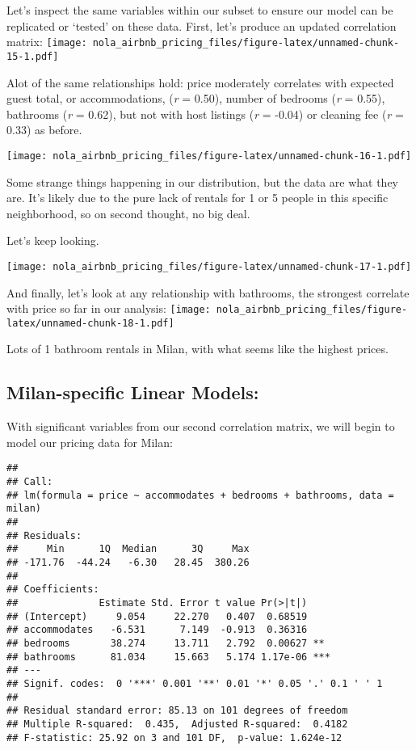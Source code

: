 \documentclass[]{article}
\begin{document}
Let's inspect the same variables within our subset to ensure our model
can be replicated or `tested' on these data. First, let's produce an
updated correlation matrix:
\texttt{[image: nola\_airbnb\_pricing\_files/figure-latex/unnamed-chunk-15-1.pdf]}

Alot of the same relationships hold: price moderately correlates with
expected guest total, or accommodations, (\emph{r} = 0.50), number of
bedrooms (\emph{r} = 0.55), bathrooms (\emph{r} = 0.62), but not with
host listings (\emph{r} = -0.04) or cleaning fee (\emph{r} = 0.33) as
before.

\texttt{[image: nola\_airbnb\_pricing\_files/figure-latex/unnamed-chunk-16-1.pdf]}

Some strange things happening in our distribution, but the data are what
they are. It's likely due to the pure lack of rentals for 1 or 5 people
in this specific neighborhood, so on second thought, no big deal.

Let's keep looking.

\texttt{[image: nola\_airbnb\_pricing\_files/figure-latex/unnamed-chunk-17-1.pdf]}

And finally, let's look at any relationship with bathrooms, the
strongest correlate with price so far in our analysis:
\texttt{[image: nola\_airbnb\_pricing\_files/figure-latex/unnamed-chunk-18-1.pdf]}

Lots of 1 bathroom rentals in Milan, with what seems like the highest
prices.

\hypertarget{milan-specific-linear-models}{%
\subsection{Milan-specific Linear
Models:}\label{milan-specific-linear-models}}

With significant variables from our second correlation matrix, we will
begin to model our pricing data for Milan:

\begin{verbatim}
## 
## Call:
## lm(formula = price ~ accommodates + bedrooms + bathrooms, data = milan)
## 
## Residuals:
##     Min      1Q  Median      3Q     Max 
## -171.76  -44.24   -6.30   28.45  380.26 
## 
## Coefficients:
##              Estimate Std. Error t value Pr(>|t|)    
## (Intercept)     9.054     22.270   0.407  0.68519    
## accommodates   -6.531      7.149  -0.913  0.36316    
## bedrooms       38.274     13.711   2.792  0.00627 ** 
## bathrooms      81.034     15.663   5.174 1.17e-06 ***
## ---
## Signif. codes:  0 '***' 0.001 '**' 0.01 '*' 0.05 '.' 0.1 ' ' 1
## 
## Residual standard error: 85.13 on 101 degrees of freedom
## Multiple R-squared:  0.435,  Adjusted R-squared:  0.4182 
## F-statistic: 25.92 on 3 and 101 DF,  p-value: 1.624e-12
\end{verbatim}
\end{document}
